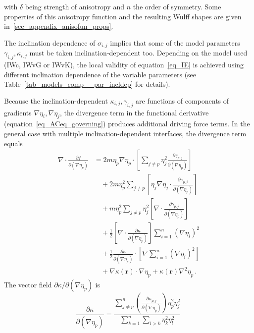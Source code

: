 with $\delta$ being strength of anisotropy and $n$ the order of symmetry. Some properties of this anisotropy function and the resulting Wulff shapes are given in~\ref{sec_appendix_anisofun_props}. 

The inclination dependence of $\sigma_{i,j}$ implies that some of the model parameters $\gamma_{i,j},\kappa_{i,j}$ must be taken inclination-dependent too. Depending on the model used (IWc, IWvG or IWvK), the local validity of equation~\eqref{eq_IE} is achieved using different inclination dependence of the variable parameters (see Table~\ref{tab_models_comp__par_incldep} for details).

Because the inclination-dependent $\kappa_{i,j},\gamma_{i,j}$ are functions of components of gradients $\nabla\eta_i,\nabla\eta_j$, the divergence term in the functional derivative (equation~\eqref{eq_ACeq_governing}) produces additional driving force terms. In the general case with multiple inclination-dependent interfaces, the divergence term equals
\begin{equation}\label{eq_incldep_divDFterms}
	\begin{split}
		\nabla\cdot \frac{\partial f}{\partial(\nabla \eta_p)} &= 2m\eta_p\nabla\eta_p\cdot \left[\sum_{j\neq p}  \eta_j^2\frac{\partial \gamma_{p,j}}{\partial (\nabla\eta_p)}\right]  \\ 
		&\quad+ 2m\eta_p^2\sum_{j\neq p} \left[\eta_j\nabla\eta_j \cdot \frac{\partial \gamma_{p,j}}{\partial (\nabla\eta_p)}\right] \\
		&\quad+ m\eta_p^2\sum_{j\neq p}\eta_j^2\left[\nabla\cdot\frac{\partial \gamma_{p,j}}{\partial (\nabla\eta_p)}\right] \\
		&\quad + \frac{1}{2}\left[\nabla\cdot\frac{\partial \kappa}{\partial (\nabla\eta_p)}\right]\sum_{i=1}^n(\nabla \eta_i)^2 \\
		&\quad+ \frac{1}{2}\frac{\partial \kappa}{\partial (\nabla\eta_p)}\cdot\left[\nabla\sum_{i=1}^n(\nabla \eta_i)^2\right]  \\
		&\quad+ \nabla\kappa(\bm{r})\cdot\nabla\eta_p + \kappa(\bm{r})\nabla^2\eta_p \,.
	\end{split} 
\end{equation}
The vector field $\partial \kappa/\partial(\nabla\eta_p)$ is
\begin{equation} \label{eq_dkppdGp}
	\frac{\partial \kappa}{\partial(\nabla\eta_p)} =  \frac{\sum\limits_{j\neq p}^n \left(\frac{\partial \kappa_{p,j}}{\partial (\nabla\eta_p)}\right)\eta_p^2\eta_j^2}{\sum\limits_{k=1}^n\sum\limits_{l>k}\eta_k^2\eta_l^2} \,
\end{equation}
